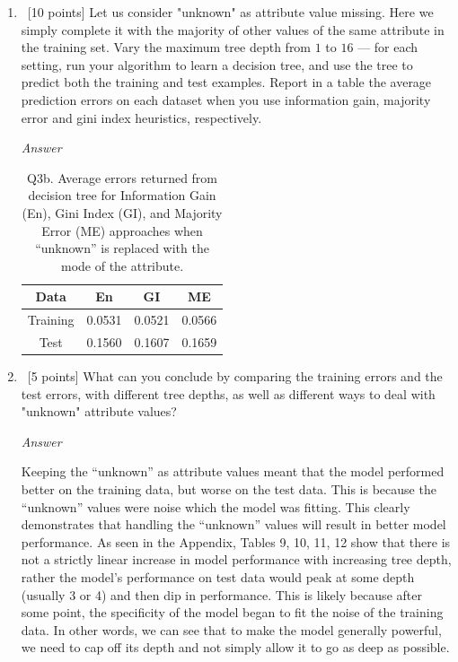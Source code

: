 \documentclass[12pt, fullpage,letterpaper]{article}
\begin{document}
\begin{enumerate}
\begin{enumerate}
	\item~[10 points] Let us consider "unknown" as  attribute value missing. Here we simply complete it with the majority of other values of the same attribute in the training set.   Vary the maximum  tree depth from $1$ to $16$ --- for each setting, run your algorithm to learn a decision tree, and use the tree to  predict both the training  and test examples. Report in a table the average prediction errors on each dataset when you use information gain, majority error and gini index heuristics, respectively.
	
	\emph{Answer}
	
	\begin{table}[h]
    	\centering
    	\begin{tabular}{c|ccc}
    		Data & En & GI & ME \\ 
    		\hline\hline
    		Training &  0.0531 & 0.0521 & 0.0566 \\ \hline
    		Test &  0.1560 & 0.1607 & 0.1659 \\ \hline
    	\end{tabular}
    	\caption{Q3b. Average errors returned from decision tree for Information Gain (En), Gini Index (GI), and Majority Error (ME) approaches when ``unknown'' is replaced with the mode of the attribute.}
    \end{table}
	
	\item~[5 points] What can you conclude by comparing the training errors and the test errors, with different tree depths, as well as different ways to deal with "unknown" attribute values?
	
	\emph{Answer}
	
	Keeping the ``unknown'' as attribute values meant that the model performed better on the training data, but worse on the test data. This is because the ``unknown'' values were noise which the model was fitting. This clearly demonstrates that handling the ``unknown'' values will result in better model performance. As seen in the Appendix, Tables 9, 10, 11, 12 show that there is not a strictly linear increase in model performance with increasing tree depth, rather the model's performance on test data would peak at some depth (usually 3 or 4) and then dip in performance. This is likely because after some point, the specificity of the model began to fit the noise of the training data. In other words, we can see that to make the model generally powerful, we need to cap off its depth and not simply allow it to go as deep as possible.
	
\end{enumerate}
\end{enumerate}
\end{document}
